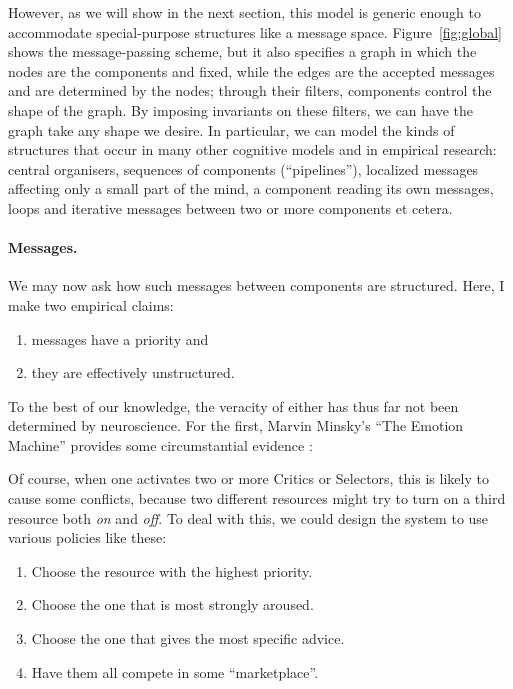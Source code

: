 However, as we will show in the next section, this model is generic enough to accommodate special-purpose structures like a message space. Figure~\ref{fig:global} shows the message-passing scheme, but it also specifies a graph in which the nodes are the components and fixed, while the edges are the accepted messages and are determined by the nodes; through their filters, components control the shape of the graph. By imposing invariants on these filters, we can have the graph take any shape we desire. In particular, we can model the kinds of structures that occur in many other cognitive models and in empirical research: central organisers, sequences of components (``pipelines''), localized messages affecting only a small part of the mind, a component reading its own messages, loops and iterative messages between two or more components et cetera.

\paragraph{Messages.}

We may now ask how such messages between components are structured. Here, I make two empirical claims:
\begin{enumerate}
	\item messages have a priority and
	\item they are effectively unstructured.
\end{enumerate}

To the best of our knowledge, the veracity of either has thus far not been determined by neuroscience. For the first, Marvin Minsky's ``The Emotion Machine'' provides some circumstantial evidence \cite[p.\ 222]{emotionMachine}:

\begin{emquote}
	Of course, when one activates two or more Critics or Selectors, this is likely to cause some conflicts, because two different resources might try to turn on a third resource both {\em on} and {\em off}. To deal with this, we could design the system to use various policies like these:
	
	\begin{enumerate}
		\item Choose the resource with the highest priority.
		\item Choose the one that is most strongly aroused.
		\item Choose the one that gives the most specific advice.
		\item Have them all compete in some ``marketplace''.
	\end{enumerate}
\end{emquote}

